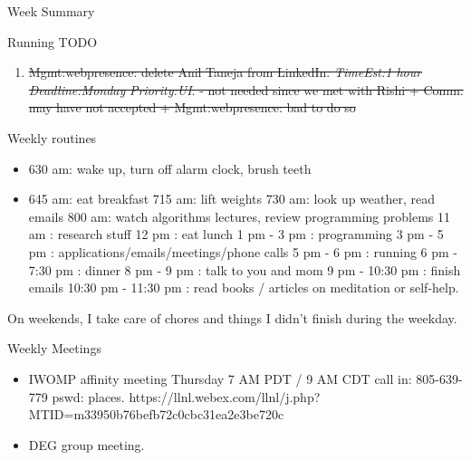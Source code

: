 \documentclass[serif, mathserif, final]{beamer}
\newcommand{\doneTask}[1]{\tiny \item \tiny \sout{#1}}
\newcommand{\te}[1]{\textit{TimeEst:}\textit{#1}}
\newcommand{\dl}[1]{\textit{Deadline:}\textit{#1}}
\newcommand{\pr}[1]{\textit{Priority:}\textit{#1}}
\begin{document}
\begin{frame}
\begin{columns}
\begin{column}{0.5\linewidth}
\begin{block}{Week Summary}
\begin{block}{Running TODO}
\begin{enumerate}
      \doneTask{Mgmt:webpresence: delete Anil Taneja from
        LinkedIn. \te{1 hour} \dl{Monday} \pr{UI}. - not needed since
        we met with Rishi  + Comm: may have not accepted +
        Mgmt:webpresence: bad to do so} 


        \end{enumerate}
      \end{block}

      
      \begin{block}{Weekly routines} 
        \begin{itemize}
          \tiny \item \tiny 630 am: wake up, turn off alarm clock, brush teeth
        \item \tiny 645 am: eat breakfast
          715 am: lift weights
          730 am: look up weather, read emails
          800 am: watch algorithms lectures, review programming problems
          11 am : research stuff
          12 pm : eat lunch
          1 pm - 3 pm : programming
          3 pm - 5 pm : applications/emails/meetings/phone calls
          5 pm  - 6 pm : running
          6 pm  - 7:30 pm : dinner
          8 pm - 9 pm : talk to you and mom
          9 pm - 10:30 pm : finish emails
          10:30 pm - 11:30 pm : read books / articles on meditation or self-help.
        \end{itemize}         
        On weekends, I take care of chores and things I didn't finish during
        the weekday. 
      \end{block} 
      
      \begin{block}{Weekly Meetings}
        \begin{itemize} 
        \item \tiny IWOMP affinity meeting Thursday 7 AM PDT / 9 AM
          CDT call in: 805-639-779 pswd: places. 
          https://llnl.webex.com/llnl/j.php?MTID=m33950b76befb72c0cbc31ea2e3be720c  
        \item \tiny DEG group meeting.  
        \end{itemize}



\end{block} 
      

\end{block}
\end{column}
\end{columns}
\end{frame}
\end{document}
